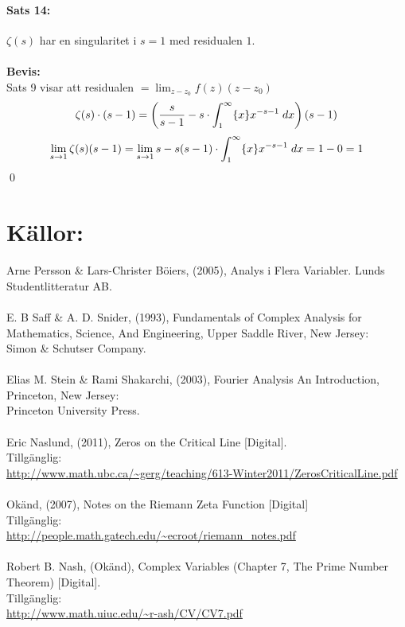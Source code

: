 \paragraph{Sats 14:} $\zeta(s)$ har en singularitet i $s = 1$ med residualen $1$.\\
\\
{\bf Bevis:}\\
Sats 9 visar att residualen $= \lim_{z - z_0} f(z)(z - z_0)$
\[
	\zeta(s) \cdot (s - 1) = \left (
		\frac {s} {s - 1} - s \cdot \int_1^\infty \{x\} x^{-s - 1} \; dx 
		\right )
	(s - 1)
\]
\[
	\lim_{s \to 1} \zeta(s)(s - 1) = \lim_{s \to 1} s - s (s - 1) \cdot \int_1^\infty \{x\} x^{-s - 1} \; dx =
		1 - 0 = 1
\]
\hfill \qed
\pagebreak
\section*{Källor:}
Arne Persson \& Lars-Christer Böiers, (2005), Analys i Flera Variabler. Lunds Studentlitteratur AB.\\
\\
E. B Saff \& A. D. Snider, (1993), Fundamentals of Complex Analysis for Mathematics, Science, And Engineering,
Upper Saddle River, New Jersey:\\
Simon \& Schutser Company.\\
\\
Elias M. Stein \& Rami Shakarchi, (2003), Fourier Analysis An Introduction, Princeton, New Jersey:\\
Princeton University Press.\\
\\
Eric Naslund, (2011), Zeros on the Critical Line [Digital].\\
Tillgänglig:\\
\url{http://www.math.ubc.ca/~gerg/teaching/613-Winter2011/ZerosCriticalLine.pdf}\\
\\
Okänd, (2007), Notes on the Riemann Zeta Function [Digital]\\
Tillgänglig:\\
\url{http://people.math.gatech.edu/~ecroot/riemann\_notes.pdf}\\
\\
Robert B. Nash, (Okänd), Complex Variables (Chapter 7, The Prime Number Theorem) [Digital].\\
Tillgänglig:\\
\url{http://www.math.uiuc.edu/~r-ash/CV/CV7.pdf}




